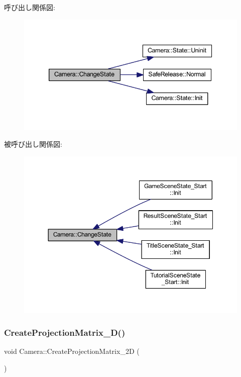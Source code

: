 呼び出し関係図\+:\nopagebreak
\begin{figure}[H]
\begin{center}
\leavevmode
\includegraphics[width=339pt]{class_camera_abb88028a49a71e9a6774d58076816dbf_cgraph}
\end{center}
\end{figure}
被呼び出し関係図\+:\nopagebreak
\begin{figure}[H]
\begin{center}
\leavevmode
\includegraphics[width=350pt]{class_camera_abb88028a49a71e9a6774d58076816dbf_icgraph}
\end{center}
\end{figure}
\mbox{\label{class_camera_aaae8043a952b7675d209bdc9b80bcc3f}} 
\subsubsection{\texorpdfstring{Create\+Projection\+Matrix\+\_\+D()}{CreateProjectionMatrix\_2D()}}
{\footnotesize\ttfamily void Camera\+::\+Create\+Projection\+Matrix\+\_\+2D (\begin{DoxyParamCaption}{ }\end{DoxyParamCaption})}



